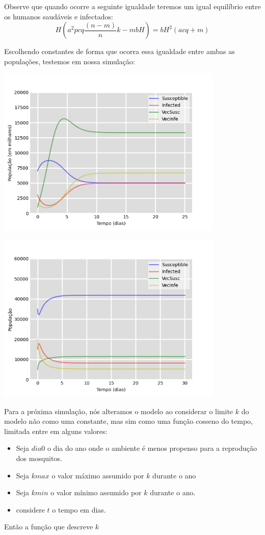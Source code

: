 \documentclass[
	12pt,				%
	openright,			%
	twoside,			%
	a4paper,			%
	english,			%
	french,				%
	spanish,			%
	brazil				%
	]{abntex2}
\begin{document}
Observe que quando ocorre a seguinte igualdade teremos um igual equilíbrio entre os humanos saudáveis e infectados: $$H(a^2pcq\frac{(n-m)}{n}k-mbH)=bH^2(acq+m)$$

Escolhendo constantes de forma que ocorra essa igualdade entre ambas as populações, testemos em nossa simulação:


\includegraphics[width=410px]{Figure_1.png}

\includegraphics[width=410px]{Figure_6.png}

Para a próxima simulação, nós alteramos o modelo ao considerar o limite $k$ do modelo não como uma constante, mas sim como uma função cosseno do tempo, limitada entre em alguns valores:

\begin{itemize}
    \item Seja $dia0$ o dia do ano onde o ambiente é menos propenso para a reprodução dos mosquitos.
    
    \item Seja $kmax$ o valor máximo assumido por $k$ durante o ano
    
    \item Seja $kmin$ o valor mínimo assumido por $k$ durante o ano.
    
    \item considere $t$ o tempo em dias.
    
\end{itemize}
Então a função que descreve $k$
\end{document}
